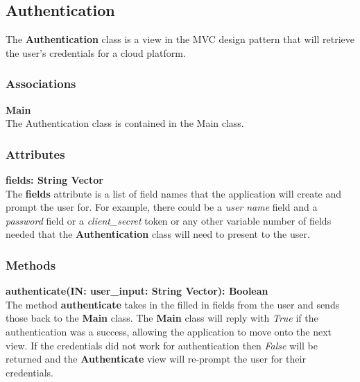 \subsection{Authentication}
The \textbf{Authentication} class is a view in the MVC design pattern that will retrieve the user's
credentials for a cloud platform.

\subsubsection{Associations}
\textbf{Main} \\
The Authentication class is contained in the Main class.


\subsubsection{Attributes}
\textbf{fields: String Vector} \\
The \textbf{fields} attribute is a list of field names that the application will create and prompt the user
for. For example, there could be a \textit{user name} field and a \textit{password} field or a \textit{
client\_secret} token or any other variable number of fields needed that the \textbf{Authentication} class
will need to present to the user.

\subsubsection{Methods}
\textbf{authenticate(IN: user\_input: String Vector): Boolean} \\
The method \textbf{authenticate} takes in the filled in fields from the user and sends those back to the
\textbf{Main} class. The \textbf{Main} class will reply with \textit{True} if the authentication was a
success, allowing the application to move onto the next view. If the credentials did not work for
authentication then \textit{False} will be returned and the \textbf{Authenticate} view will re-prompt the user
for their credentials.
  
